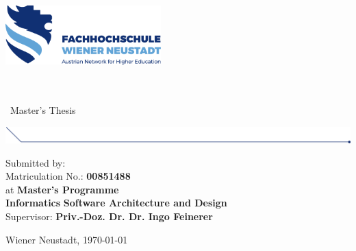 
\makeatletter

\begin{titlepage}

  \includegraphics[width=6cm]{images/fhwn-logo.png}

  \vspace{200pt}
  {\noindent\color{header-blue}\Huge\textbf{\@title}}\\
  \vspace{5pt}\\
  {\noindent\LARGE~Master's Thesis}
  \vspace{20pt}

  \hspace{-35mm}
  \includegraphics[width=18.67cm]{images/titlepage-line.png}

  \vspace{15pt}

  \tabto{2cm}Submitted by: \tabto{7cm}\textbf{\@author} \\
  \tabto{2cm}Matriculation No.: \tabto{7cm}\textbf{00851488} \\
  \vspace{15pt}
  \tabto{2cm}at \tabto{7cm}\textbf{Master's Programme}\\
  \tabto{7cm}\textbf{Informatics}
  \tabto{7cm}\textbf{Software Architecture and Design} \\
  \vspace{15pt}
  \tabto{2cm}Supervisor: \tabto{7cm}\textbf{Priv.-Doz. Dr. Dr. Ingo Feinerer}

  \vfill

  Wiener Neustadt, \today
      
\end{titlepage}
\makeatother

